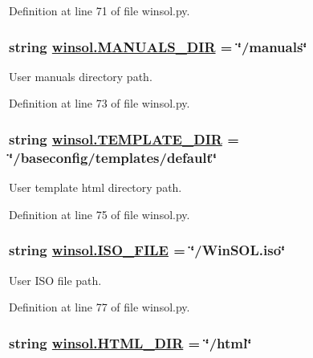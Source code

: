 Definition at line 71 of file winsol.py.\hypertarget{namespacewinsol_ebc977350ca28d117f351ac77dbc9514}{
\subsubsection[MANUALS\_\-DIR]{\setlength{\rightskip}{0pt plus 5cm}string \hyperlink{namespacewinsol_ebc977350ca28d117f351ac77dbc9514}{winsol.MANUALS\_\-DIR} = \char`\"{}/manuals\char`\"{}}}
\label{namespacewinsol_ebc977350ca28d117f351ac77dbc9514}


User manuals directory path. 



Definition at line 73 of file winsol.py.\hypertarget{namespacewinsol_8bc163ee74d98083104d5033c3262940}{
\subsubsection[TEMPLATE\_\-DIR]{\setlength{\rightskip}{0pt plus 5cm}string \hyperlink{namespacewinsol_8bc163ee74d98083104d5033c3262940}{winsol.TEMPLATE\_\-DIR} = \char`\"{}/baseconfig/templates/default\char`\"{}}}
\label{namespacewinsol_8bc163ee74d98083104d5033c3262940}


User template html directory path. 



Definition at line 75 of file winsol.py.\hypertarget{namespacewinsol_3143fdfd6d34bd48ac2fec1e067af1df}{
\subsubsection[ISO\_\-FILE]{\setlength{\rightskip}{0pt plus 5cm}string \hyperlink{namespacewinsol_3143fdfd6d34bd48ac2fec1e067af1df}{winsol.ISO\_\-FILE} = \char`\"{}/Win\-SOL.iso\char`\"{}}}
\label{namespacewinsol_3143fdfd6d34bd48ac2fec1e067af1df}


User ISO file path. 



Definition at line 77 of file winsol.py.\hypertarget{namespacewinsol_bbcde53c0ba69049711616caed5431b6}{
\subsubsection[HTML\_\-DIR]{\setlength{\rightskip}{0pt plus 5cm}string \hyperlink{namespacewinsol_bbcde53c0ba69049711616caed5431b6}{winsol.HTML\_\-DIR} = \char`\"{}/html\char`\"{}}}
\label{namespacewinsol_bbcde53c0ba69049711616caed5431b6}


